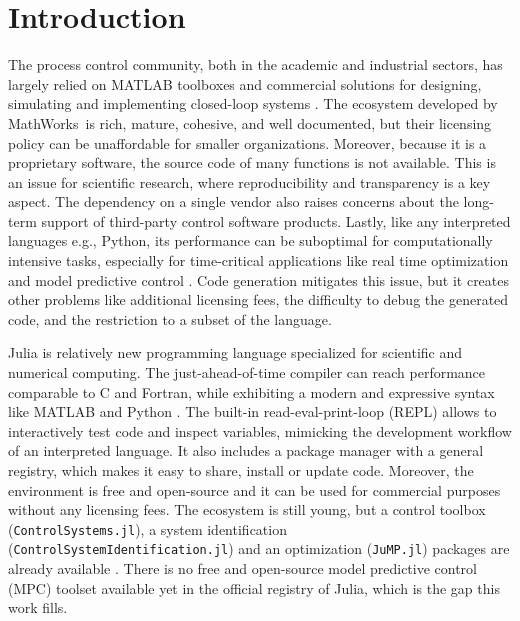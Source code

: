 \section{Introduction}

The process control community, both in the academic and industrial sectors, has largely relied on MATLAB toolboxes and commercial solutions for designing, simulating and implementing closed-loop systems \citep{optimMatlab}. The ecosystem developed by MathWorks\texttrademark\ is rich, mature, cohesive, and well documented, but their licensing policy can be unaffordable for smaller organizations. Moreover, because it is a proprietary software, the source code of many functions is not available. This is an issue for scientific research, where reproducibility and transparency is a key aspect. The dependency on a single vendor also raises concerns about the long-term support of third-party control software products. Lastly, like any interpreted languages e.g., Python, its performance can be suboptimal for computationally intensive tasks, especially for time-critical applications like real time optimization and model predictive control \citep{matlabPythonJulia, juliaML}. Code generation mitigates this issue, but it creates other problems like additional licensing fees, the difficulty to debug the generated code, and the restriction to a subset of the language.

Julia is relatively new programming language specialized for scientific and numerical computing. The just-ahead-of-time compiler can reach performance comparable to C and Fortran, while exhibiting a modern and expressive syntax like MATLAB and Python \citep{juliaPaper}. The built-in read-eval-print-loop (REPL) allows to interactively test code and inspect variables, mimicking the development workflow of an interpreted language. It also includes a package manager with a general registry, which makes it easy to share, install or update code. Moreover, the environment is free and open-source and it can be used for commercial purposes without any licensing fees. The ecosystem is still young, but a control toolbox (\texttt{ControlSystems.jl}), a system identification (\texttt{ControlSystemIdentification.jl}) and an optimization (\texttt{JuMP.jl}) packages are already available \citep{controlsystems, jump}. There is no free and open-source model predictive control (MPC) toolset available yet in the official registry of Julia, which is the gap this work fills.


